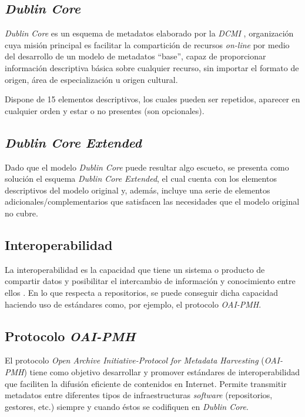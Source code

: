 \subsection{\emph{Dublin Core}}

\emph{Dublin Core} es un esquema de metadatos elaborado por la
\emph{DCMI} \cite{weboff:dc}, organización cuya misión
principal es facilitar la compartición de recursos \emph{on-line} por
medio del desarrollo de un modelo de metadatos ``base'', capaz de
proporcionar información descriptiva básica sobre cualquier recurso, sin
importar el formato de origen, área de especialización u origen
cultural. 

Dispone de 15 elementos descriptivos, los cuales pueden ser
repetidos, aparecer en cualquier orden y estar o no presentes
(son opcionales).

\subsection{\emph{Dublin Core Extended}}

Dado que el modelo \emph{Dublin Core} puede resultar algo escueto, se
presenta como solución el esquema \emph{Dublin Core Extended}, el cual
cuenta con los elementos descriptivos del modelo original y, además,
incluye una serie de elementos adicionales/complementarios \cite{weboff:dcterms}
que satisfacen las necesidades que el modelo original no cubre.

\subsection{Interoperabilidad}

La interoperabilidad es la capacidad que tiene un sistema o producto de
compartir datos y posibilitar el intercambio de información y
conocimiento entre ellos \cite{weboff:interop}.
En lo que respecta a repositorios, se puede conseguir dicha capacidad
haciendo uso de estándares como, por ejemplo, el protocolo
\emph{OAI-PMH}.

\subsection{Protocolo \emph{OAI-PMH}}

El protocolo \emph{Open Archive Initiative-Protocol for Metadata
Harvesting} (\emph{OAI-PMH}) tiene como objetivo desarrollar y promover
estándares de interoperabilidad que faciliten la difusión eficiente de
contenidos en Internet. Permite transmitir metadatos entre diferentes
tipos de infraestructuras \emph{software} (repositorios, gestores, etc.)
siempre y cuando éstos se codifiquen en \emph{Dublin Core}.

